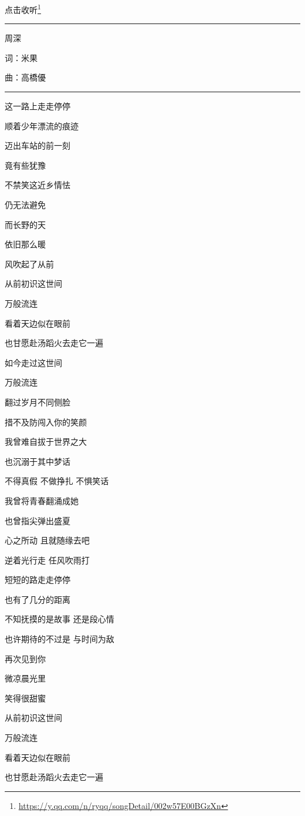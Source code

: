 \documentclass[]{ctexbook}
\renewcommand{\href}[2]{#2\footnote{\url{#1}}}
\begin{document}
\href{https://y.qq.com/n/ryqq/songDetail/002w57E00BGzXn}{点击收听}

\begin{center}\rule{0.5\linewidth}{0.5pt}\end{center}

周深

词：米果

曲：高橋優

\begin{center}\rule{0.5\linewidth}{0.5pt}\end{center}

这一路上走走停停

顺着少年漂流的痕迹

迈出车站的前一刻

竟有些犹豫

不禁笑这近乡情怯

仍无法避免

而长野的天

依旧那么暖

风吹起了从前

从前初识这世间

万般流连

看着天边似在眼前

也甘愿赴汤蹈火去走它一遍

如今走过这世间

万般流连

翻过岁月不同侧脸

措不及防闯入你的笑颜

我曾难自拔于世界之大

也沉溺于其中梦话

不得真假 不做挣扎 不惧笑话

我曾将青春翻涌成她

也曾指尖弹出盛夏

心之所动 且就随缘去吧

逆着光行走 任风吹雨打

短短的路走走停停

也有了几分的距离

不知抚摸的是故事 还是段心情

也许期待的不过是 与时间为敌

再次见到你

微凉晨光里

笑得很甜蜜

从前初识这世间

万般流连

看着天边似在眼前

也甘愿赴汤蹈火去走它一遍
\end{document}
